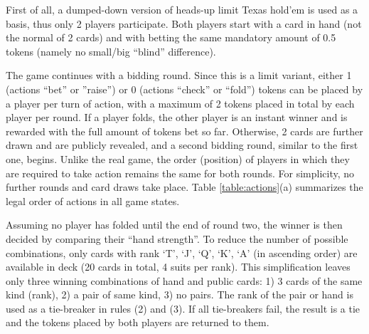 First of all, a dumped-down version of heads-up limit Texas hold'em is used as a basis, thus only 2 players participate. Both players start with a card in hand (not the normal of 2 cards) and with betting the same mandatory amount of 0.5 tokens (namely no small/big ``blind'' difference). 

The game continues with a bidding round. Since this is a limit variant, either 1 (actions ``bet'' or ''raise'') or 0 (actions ``check'' or ``fold'') tokens can be placed by a player per turn of action, with a maximum of 2 tokens placed in total by each player per round. If a player folds, the other player is an instant winner and is rewarded with the full amount of tokens bet so far. Otherwise, 2 cards are further drawn and are publicly revealed, and a second bidding round, similar to the first one, begins. Unlike the real game, the order (position) of players in which they are required to take action remains the same for both rounds. For simplicity, no further rounds and card draws take place. Table \ref{table:actions}(a) summarizes the legal order of actions in all game states.

Assuming no player has folded until the end of round two, the winner is then decided by comparing their ``hand strength''. To reduce the number of possible combinations, only cards with rank `T', `J', `Q', `K', `A' (in ascending order) are available in deck (20 cards in total, 4 suits per rank). This simplification leaves only three winning combinations of hand and public cards: 1) 3 cards of the same kind (rank), 2) a pair of same kind, 3) no pairs. The rank of the pair or hand is used as a tie-breaker in rules (2) and (3). If all tie-breakers fail, the result is a tie and the tokens placed by both players are returned to them.

